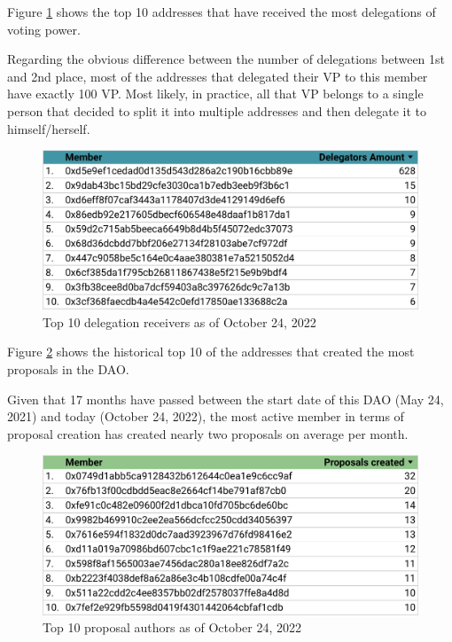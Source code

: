 \documentclass[MSE,Master,english]{twbook}%
\begin{document}
Figure \ref{fig:top_delegates} shows the top 10 addresses that have received the most delegations of voting power.

Regarding the obvious difference between the number of delegations between 1st and 2nd place, most of the addresses that delegated their VP to this member have exactly 100 VP. Most likely, in practice, all that VP belongs to a single person that decided to split it into multiple addresses and then delegate it to himself/herself.
\begin{figure}[H]
  \centering
  \includegraphics[width=\textwidth]{metrics/top_delegates.png}
  \caption{Top 10 delegation receivers as of October 24, 2022}
  \label{fig:top_delegates}
\end{figure}

Figure \ref{fig:top_authors} shows the historical top 10 of the addresses that created the most proposals in the \gls{DAO}.

Given that 17 months have passed between the start date of this \gls{DAO} (May 24, 2021) and today (October 24, 2022), the most active member in terms of proposal creation has created nearly two proposals on average per month.
\begin{figure}[H]
  \centering
  \includegraphics[width=\textwidth]{metrics/top_authors.png}
  \caption{Top 10 proposal authors as of October 24, 2022}
  \label{fig:top_authors}
\end{figure}
\pagebreak
\end{document}

